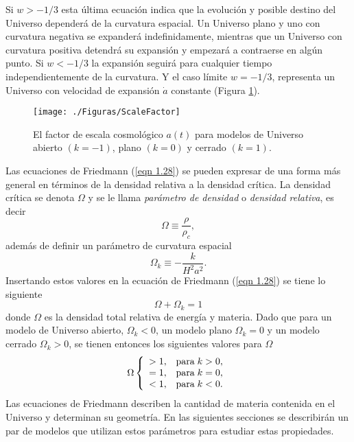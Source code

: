 \documentclass[a4paper,openright,12pt]{book}
\begin{document}
Si $w > -1/3$ esta última ecuación indica que la evolución y posible destino del Universo dependerá de la curvatura espacial. Un Universo plano y uno con curvatura negativa se expanderá indefinidamente, mientras que un Universo con curvatura positiva detendrá su expansión y empezará a contraerse en algún punto. Si $w < -1/3$ la expansión seguirá para cualquier tiempo independientemente de la curvatura. Y el caso límite $w = - 1/3$, representa un Universo con velocidad de expansión $\dot{a}$ constante (Figura \ref{fig 1.1}).
\begin{figure}
\centering
    \texttt{[image: ./Figuras/ScaleFactor]}
  \caption{\footnotesize{El factor de escala cosmológico $a(t)$ para modelos de Universo abierto $(k = -1)$, plano $(k = 0)$ y cerrado $(k = 1)$.}}
  \label{fig 1.1}
\end{figure}

Las ecuaciones de Friedmann  (\ref{eqn 1.28}) se pueden expresar de una forma más general en términos de la densidad relativa a la densidad crítica. La densidad crítica se denota $\Omega$ y se le llama \textit{parámetro de densidad} o \textit{densidad relativa}, es decir
\begin{equation}
\Omega \equiv \frac{\rho}{\rho_{c}},\label{eqn 1.38}
\end{equation}
además de definir un parámetro de curvatura espacial
\begin{equation}
\Omega_{k} \equiv -\frac{k}{H^{2}a^{2}}.\label{eqn 1.39}
\end{equation}
Insertando estos valores en la ecuación de Friedmann (\ref{eqn 1.28}) se tiene lo siguiente
\begin{equation}
\Omega + \Omega_{k} = 1\label{eqn 1.40}
\end{equation}
donde $\Omega$ es la densidad total relativa de energía y materia. Dado que para un modelo de Universo abierto, $\Omega_{k} < 0$, un modelo plano $\Omega_{k} = 0 $ y un modelo cerrado $\Omega_{k} > 0$, se tienen entonces los siguientes valores para $\Omega$
\begin{equation}
\Omega  \left\lbrace
\begin{array}{ll}
> 1, & \textup{para} \; k > 0, \\
= 1, & \textup{para} \; k = 0, \\
< 1, & \textup{para} \; k < 0. \\ \label{eqn 1.41}
\end{array}
\right.
\end{equation}
Las ecuaciones de Friedmann describen la cantidad de materia contenida en el Universo y determinan su geometría. En las siguientes secciones se describirán un par de modelos que utilizan estos parámetros para estudiar estas propiedades.
\end{document}
